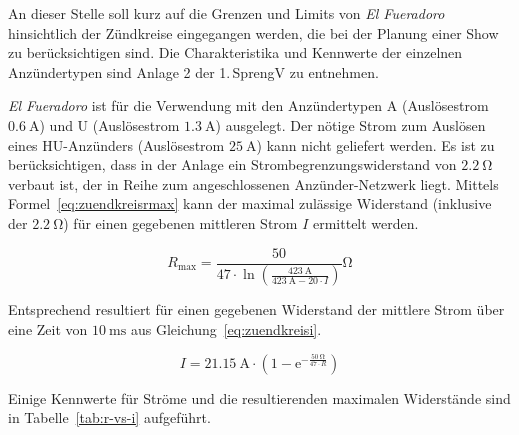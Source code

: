 \documentclass[paper=a4, parskip, numbers=noenddot, toc=listof, headsepline]{scrbook}
\newcommand{\anlage}{\emph{El Fueradoro}}
\begin{document}
				An dieser Stelle soll kurz auf die Grenzen und Limits von {\anlage} hinsichtlich der Zündkreise eingegangen werden, die bei der Planung einer Show zu berücksichtigen sind. Die Charakteristika und Kennwerte der einzelnen Anzündertypen sind Anlage 2 der 1.\,SprengV zu entnehmen.

					{\anlage} ist für die Verwendung mit den Anzündertypen A (Auslösestrom $\SI{0,6}{\ampere}$) und U (Auslösestrom $\SI{1,3}{\ampere}$) ausgelegt. Der nötige Strom zum Auslösen eines HU-Anzünders (Auslösestrom $\SI{25}{\ampere}$) kann nicht geliefert werden. Es ist zu berücksichtigen, dass in der Anlage ein Strombegrenzungswiderstand von $\SI{2,2}{\ohm}$ verbaut ist, der in Reihe zum angeschlossenen Anzünder-Netzwerk liegt. Mittels Formel~\eqref{eq:zuendkreisrmax} kann der maximal zulässige Widerstand (inklusive der $\SI{2,2}{\ohm}$) für einen gegebenen mittleren Strom $I$ ermittelt werden.

				\begin{equation}
					R_\text{max} = \frac{50}{47 {\cdot} \ln\left(\frac{\SI{423}{\ampere}}{\SI{423}{\ampere} - 20 {\cdot} I}\right)}\si{\ohm}
					\label{eq:zuendkreisrmax}
				\end{equation}

				Entsprechend resultiert für einen gegebenen Widerstand der mittlere Strom über eine Zeit von $\SI{10}{\milli\second}$ aus Gleichung~\eqref{eq:zuendkreisi}.

				\begin{equation}
					I = \SI{21,15}{\ampere} {\cdot} \left(1 - \mathrm{e}^{-\frac{\SI{50}{\ohm}}{47 {\cdot} R}}\right)
					\label{eq:zuendkreisi}
				\end{equation}

				Einige Kennwerte für Ströme und die resultierenden maximalen Widerstände sind in Tabelle~\ref{tab:r-vs-i} aufgeführt.
\end{document}
